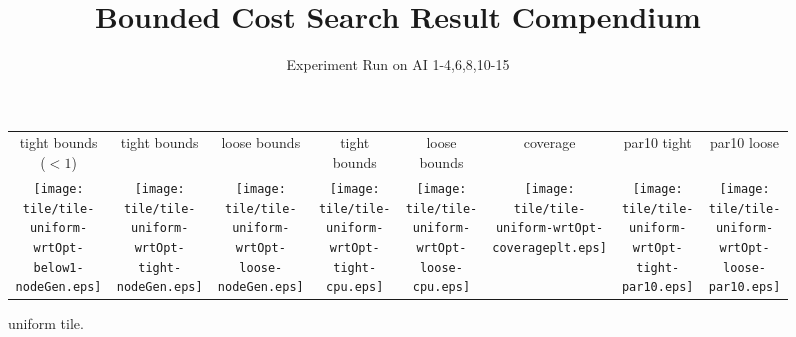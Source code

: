 \documentclass[a4paper,landscape]{article}
\title{Bounded Cost Search Result Compendium}
\author{Experiment Run on AI 1-4,6,8,10-15}
\begin{document}
\maketitle
\newcommand{\cpufigureplotwidth}{0.1\textwidth}
\begin{figure}[t]
	\centering
	\begin{tabular}{c c c c c c c c}
	    tight bounds ($<1$) & tight bounds & loose bounds & tight bounds & loose bounds & coverage & par10 tight & par10 loose\\
	   \begin{minipage}{\cpufigureplotwidth}
       \texttt{[image: tile/tile-uniform-wrtOpt-below1-nodeGen.eps]}
        \end{minipage}&
        \begin{minipage}{\cpufigureplotwidth}
        \texttt{[image: tile/tile-uniform-wrtOpt-tight-nodeGen.eps]}
        \end{minipage}&
        \begin{minipage}{\cpufigureplotwidth}
       \texttt{[image: tile/tile-uniform-wrtOpt-loose-nodeGen.eps]}
        \end{minipage}&
        \begin{minipage}{\cpufigureplotwidth}
        \texttt{[image: tile/tile-uniform-wrtOpt-tight-cpu.eps]}
        \end{minipage}&
        \begin{minipage}{\cpufigureplotwidth}
        \texttt{[image: tile/tile-uniform-wrtOpt-loose-cpu.eps]}
        \end{minipage}&
        \begin{minipage}{\cpufigureplotwidth}
        \texttt{[image: tile/tile-uniform-wrtOpt-coverageplt.eps]}
        \end{minipage}&
        \begin{minipage}{\cpufigureplotwidth}
        \texttt{[image: tile/tile-uniform-wrtOpt-tight-par10.eps]}
        \end{minipage}&
        \begin{minipage}{\cpufigureplotwidth}
        \texttt{[image: tile/tile-uniform-wrtOpt-loose-par10.eps]}
        \end{minipage}
	\end{tabular}
\caption{uniform tile.}
\label{fig:tile-uniform}
\end{figure}
\end{document}
